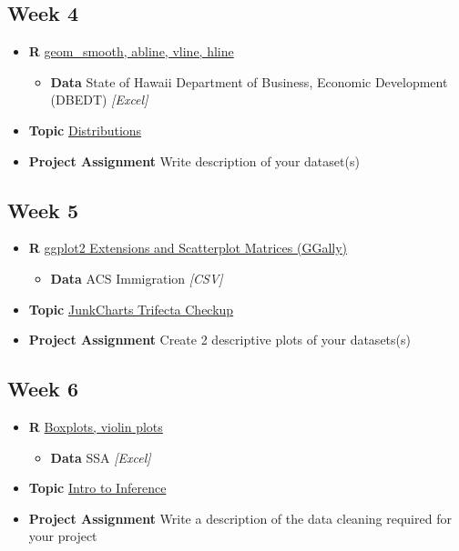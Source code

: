 \documentclass[]{book}
\providecommand{\tightlist}{%
  \setlength{\itemsep}{0pt}\setlength{\parskip}{0pt}}
\theoremstyle{definition}
\theoremstyle{definition}
\theoremstyle{remark}
\begin{document}
\subsection*{Week 4}\label{week-4}

\begin{itemize}
\tightlist
\item
  \textbf{R} \protect\hyperlink{lines}{geom\_smooth, abline, vline,
  hline}

  \begin{itemize}
  \tightlist
  \item
    \textbf{Data} State of Hawaii Department of Business, Economic
    Development (DBEDT) \emph{{[}Excel{]}}
  \end{itemize}
\item
  \textbf{Topic} \protect\hyperlink{distributions}{Distributions}
\item
  \textbf{Project Assignment} Write description of your dataset(s)
\end{itemize}

\subsection*{Week 5}\label{week-5}

\begin{itemize}
\tightlist
\item
  \textbf{R} \protect\hyperlink{ggplot-exts}{ggplot2 Extensions and
  Scatterplot Matrices (GGally)}

  \begin{itemize}
  \tightlist
  \item
    \textbf{Data} ACS Immigration \emph{{[}CSV{]}}
  \end{itemize}
\item
  \textbf{Topic} \protect\hyperlink{trifecta}{JunkCharts Trifecta
  Checkup}
\item
  \textbf{Project Assignment} Create 2 descriptive plots of your
  datasets(s)
\end{itemize}

\subsection*{Week 6}\label{week-6}

\begin{itemize}
\tightlist
\item
  \textbf{R} \protect\hyperlink{boxplots-and-violins}{Boxplots, violin
  plots}

  \begin{itemize}
  \tightlist
  \item
    \textbf{Data} SSA \emph{{[}Excel{]}}
  \end{itemize}
\item
  \textbf{Topic} \protect\hyperlink{inference}{Intro to Inference}
\item
  \textbf{Project Assignment} Write a description of the data cleaning
  required for your project
\end{itemize}
\end{document}
